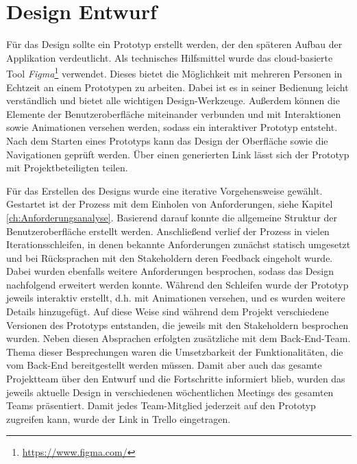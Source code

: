\section{Design Entwurf}
Für das Design sollte ein Prototyp erstellt werden, der den späteren Aufbau der Applikation verdeutlicht.
Als technisches Hilfsmittel wurde das cloud-basierte Tool \textit{Figma}\footnote{\url{https://www.figma.com/}} verwendet.
Dieses bietet die Möglichkeit mit mehreren Personen in Echtzeit an einem Prototypen zu arbeiten.
Dabei ist es in seiner Bedienung leicht verständlich und bietet alle wichtigen Design-Werkzeuge. 
Außerdem können die Elemente der Benutzeroberfläche miteinander verbunden und mit Interaktionen sowie Animationen versehen werden, sodass ein interaktiver Prototyp entsteht.
Nach dem Starten eines Prototyps kann das Design der Oberfläche sowie die Navigationen geprüft werden.
Über einen generierten Link lässt sich der Prototyp mit Projektbeteiligten teilen. 

Für das Erstellen des Designs wurde eine iterative Vorgehensweise gewählt.  
Gestartet ist der Prozess mit dem Einholen von Anforderungen, siehe Kapitel \ref{ch:Anforderungsanalyse}.
Basierend darauf konnte die allgemeine Struktur der Benutzeroberfläche erstellt werden.
Anschließend verlief der Prozess in vielen Iterationsschleifen, in denen bekannte Anforderungen zunächst statisch umgesetzt und bei Rücksprachen mit den Stakeholdern deren Feedback eingeholt wurde.
Dabei wurden ebenfalls weitere Anforderungen besprochen, sodass das Design nachfolgend erweitert werden konnte.
Während den Schleifen wurde der Prototyp jeweils interaktiv erstellt, d.h. mit Animationen versehen, und es wurden weitere Details hinzugefügt.
Auf diese Weise sind während dem Projekt verschiedene Versionen des Prototyps entstanden, die jeweils mit den Stakeholdern besprochen wurden.
Neben diesen Absprachen erfolgten zusätzliche mit dem Back-End-Team.
Thema dieser Besprechungen waren die Umsetzbarkeit der Funktionalitäten, die vom Back-End bereitgestellt werden müssen.
Damit aber auch das gesamte Projektteam über den Entwurf und die Fortschritte informiert blieb, wurden das jeweils aktuelle Design in verschiedenen wöchentlichen Meetings des gesamten Teams präsentiert.
Damit jedes Team-Mitglied jederzeit auf den Prototyp zugreifen kann, wurde der Link in Trello eingetragen. 

